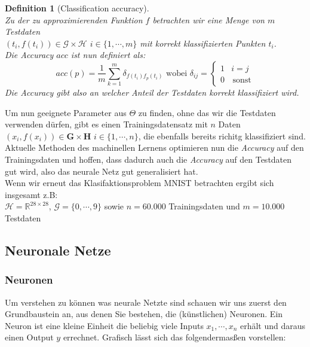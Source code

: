 \documentclass[]{scrartcl}
\newtheorem{defi}[satz]{Definition}
\begin{document}
		\begin{defi}[Classification accuracy] ~\\
			Zu der zu approximierenden Funktion $f$ betrachten wir eine Menge von $m$ Testdaten \\
			$(t_i, f(t_i)) \in \mathcal{G} \times \mathcal{H}$ $i \in \{1, \cdots , m\}$ mit korrekt klassifizierten Punkten $t_i$. \\
			Die Accuracy $acc$ ist nun definiert als:
			$$ acc(p) = \frac{1}{m} \sum_{k=1}^m \delta_{f(t_i)f_p(t_i)} \text{ wobei } \delta_{ij} =
			\begin{cases}
				1 & i = j \\
				0 & \, \text{sonst}
			\end{cases}$$
			Die Accuracy gibt also an welcher Anteil der Testdaten korrekt klassifiziert wird.
		\end{defi}
		
		Um nun geeignete Parameter aus $\Theta$ zu finden, ohne das wir die Testdaten verwenden dürfen, gibt es einen Trainingsdatensatz mit $n$ Daten\\
		$(x_i, f(x_i)) \in \mathbf{G} \times \mathbf{H}$ $i \in \{1, \cdots , n\}$, die ebenfalls bereits richitg klassifiziert sind.
		Aktuelle Methoden des machinellen Lernens optimieren nun die \textit{Accuracy} auf den Trainingsdaten und hoffen, dass dadurch auch die \textit{Accuracy} auf den
		Testdaten gut wird, also das neurale Netz gut generalisiert hat.\\

		Wenn wir erneut das Klasifaktionsproblem MNIST betrachten ergibt sich insgesamt z.B: \\
		$\mathcal{H} = \mathbb{R}^{28 \times 28}$, $\mathcal{G} = \{0, \cdots, 9\}$ sowie $n = 60.000$ Trainingsdaten und $m = 10.000$ Testdaten


	\subsection{Neuronale Netze}\label{nets}
		
		\subsubsection{Neuronen}

			Um verstehen zu können was neurale Netzte sind schauen wir uns zuerst den Grundbaustein an, aus denen Sie bestehen, die (künstlichen) Neuronen.
			Ein Neuron ist eine kleine Einheit die beliebig viele Inputs $x_1, \cdots, x_n$ erhält und daraus einen Output $y$ errechnet.
			Grafisch lässt sich das folgendermasßen vorstellen:
\end{document}
